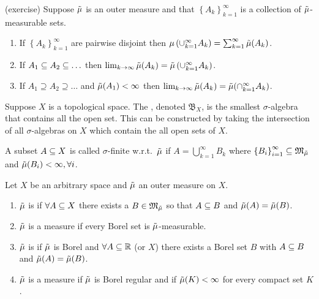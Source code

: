 \begin{thm}(exercise)
  Suppose $\tilde{\mu}$ is an outer measure and that $\left\{ A_k
  \right\}_{k=1}^\infty$ is a collection of $\tilde{\mu}$-measurable sets.
  \begin{enumerate}
    \item If $\left\{ A_k\right\}_{k=1}^\infty$ are pairwise disjoint then
      $\mu\left( \cup_{k=1}^\infty A_k \right) =
      \sum_{k=1}^\infty\tilde{\mu}(A_k)$.
    \item If $A_1\subseteq A_2 \subseteq \ldots$ then
      $\lim_{k\to \infty}\tilde{\mu}(A_k) = \tilde{\mu}\left( \cup_{k=1}^\infty A_k
      \right)$.
    \item If $A_1 \supseteq A_2 \supseteq \ldots$ and $\tilde{\mu}(A_1) <
      \infty$ then $\lim_{k\to \infty}\tilde{\mu}(A_k) = \tilde{\mu}(\cap_{k=1}^\infty
      A_k)$.
  \end{enumerate}
\end{thm}

\begin{defn}
  Suppose $X$ is a topological space. The , denoted $\mathfrak{B}_X$, is the smallest $\sigma$-algebra that contains all
  the open set. This can be constructed by taking the intersection of
  all $\sigma$-algebras on $X$ which contain the all open sets of
  $X$.
\end{defn}

\begin{defn}
  A subset $A\subseteq X$ is called $\sigma$-finite w.r.t.\ $\tilde{\mu}$ if
  $A=\bigcup_{k=1}^\infty B_k$ where $\left\{ B_i \right\}_{i=1}^\infty\subseteq \mathfrak{M}_{\tilde{\mu}}$ and
  $\tilde{\mu}(B_i)<\infty, \forall i$.
\end{defn}

\begin{defn}\mbox{}
  Let $X$ be an arbitrary space and $\tilde{\mu}$ an outer measure on $X$.
  \begin{enumerate}
    \item $\tilde{\mu}$ is  if $\forall A\subseteq X$ there exists a
      $B\in\mathfrak{M}_{\tilde{\mu}}$ so that $A\subseteq B$ and $\tilde{\mu}(A) = \tilde{\mu}(B)$.
    \item $\tilde{\mu}$ is a  measure if every Borel set is
      $\tilde{\mu}$-measurable.
    \item $\tilde{\mu}$ is  if $\tilde{\mu}$ is Borel and
      $\forall A\subseteq \mathbb{R}$ (or $X$) there exists a Borel set
      $B$ with $A\subseteq B$ and $\tilde{\mu}(A)=\tilde{\mu}(B)$.
    \item $\tilde{\mu}$ is a  measure if $\tilde{\mu}$ is Borel regular and if
      $\tilde{\mu}(K)<\infty$ for every compact set $K$.
  \end{enumerate}
\end{defn}

